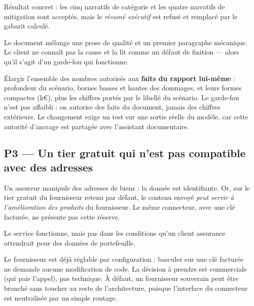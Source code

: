 Résultat concret : les cinq narratifs de catégorie et les quatre narratifs de
mitigation sont acceptés, mais le \emph{résumé exécutif} est refusé et remplacé
par le gabarit calculé.

\begin{douleur}[title={Douleur observée}]
Le document mélange une prose de qualité et un premier paragraphe mécanique. Le
client ne connaît pas la cause et la lit comme un défaut de finition — alors
qu'il s'agit d'un garde-fou qui fonctionne.
\end{douleur}

\begin{remede}[title={Remède proposé}]
Élargir l'ensemble des nombres autorisés aux \textbf{faits du rapport lui-même} :
profondeur du scénario, bornes basses et hautes des dommages, et leurs formes
compactes (k€), plus les chiffres portés par le libellé du scénario. Le garde-fou
n'est pas affaibli : on autorise des faits du document, jamais des chiffres
extérieurs. Le changement exige un test sur une sortie réelle du modèle, car
cette autorité d'ancrage est partagée avec l'assistant documentaire.
\end{remede}

\subsection{P3 — Un tier gratuit qui n'est pas compatible avec des adresses}

Un assureur manipule des adresses de biens : la donnée est identifiante. Or, sur
le tier gratuit du fournisseur retenu par défaut, le contenu envoyé
\emph{peut servir à l'amélioration des produits} du fournisseur. Le même
connecteur, avec une clé facturée, ne présente pas cette réserve.

\begin{douleur}[title={Douleur}]
Le service fonctionne, mais pas dans les conditions qu'un client assurance
attendrait pour des données de portefeuille.
\end{douleur}

\begin{remede}[title={Remède proposé}]
Le fournisseur est déjà réglable par configuration : basculer sur une clé
facturée ne demande aucune modification de code. La décision à prendre est
commerciale (qui paie l'appel), pas technique. À défaut, un fournisseur
souverain peut être branché sans toucher au reste de l'architecture, puisque
l'interface du connecteur est neutralisée par un simple routage.
\end{remede}

